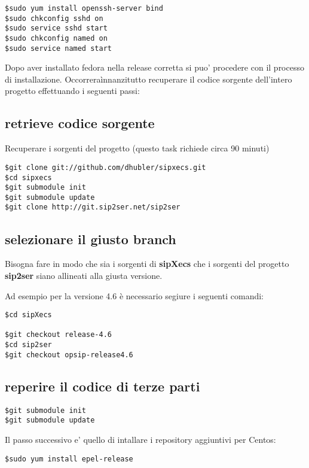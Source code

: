 \begin{verbatim}
$sudo yum install openssh-server bind
$sudo chkconfig sshd on
$sudo service sshd start
$sudo chkconfig named on 
$sudo service named start
\end{verbatim}

Dopo aver installato fedora nella release corretta si puo' procedere con il processo di installazione. Occorrera\` innanzitutto recuperare il codice sorgente dell'intero progetto effettuando i seguenti passi:

\subsection{retrieve codice sorgente}

Recuperare i sorgenti del progetto (questo task richiede circa 90 minuti) 

\begin{verbatim}
$git clone git://github.com/dhubler/sipxecs.git
$cd sipxecs  
$git submodule init 
$git submodule update
$git clone http://git.sip2ser.net/sip2ser
\end{verbatim}


\subsection{selezionare il giusto branch}

Bisogna fare in modo che sia i sorgenti di \textbf{sipXecs} che i sorgenti del progetto \textbf{sip2ser} siano allineati alla giusta versione.

Ad esempio per la versione 4.6 \`e necessario segiure i seguenti comandi:

\begin{verbatim}
$cd sipXecs

$git checkout release-4.6
$cd sip2ser
$git checkout opsip-release4.6
\end{verbatim}

\subsection{reperire il codice di terze parti}

\begin{verbatim} 
$git submodule init 
$git submodule update
\end{verbatim}

Il passo successivo e' quello di intallare i repository aggiuntivi per Centos:

\begin{verbatim}
$sudo yum install epel-release
\end{verbatim}

